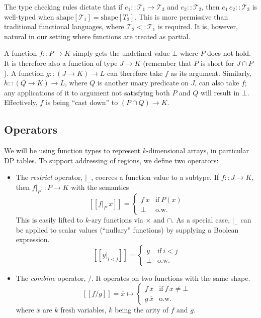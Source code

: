\documentclass{article}
\newcommand\newterm[1]{{\it #1}}
\newcommand\T{\mathcal{T}}
\newcommand\semp[1]{[\![{#1}]\!]}
\begin{document}
The type checking rules dictate that if $e_1::\T_1\to\T_3$ and $e_2::\T_2$, then $e_1\,e_2::\T_3$
is well-typed when $\mathrm{shape}[\T_1]=\mathrm{shape}[T_2]$. This is more permissive
than traditional functional languages, where $\T_2<:\T_1$ is required. It is, however,
natural in our setting where functions are treated as partial.

A function $f :: P\to K$ simply gets the undefined value $\bot$ where $P$ does not hold.
It is therefore also a function of type $J\to K$ (remember that $P$ is short for $J\cap P$).
A function $g :: (J\to K)\to L$ can therefore take $f$ as its argument.
Similarly, $h :: (Q\to K)\to L$, where $Q$ is another unary predicate on $J$, can also take $f$;
any applications of it to argument not satisfying both $P$ and $Q$ will result in $\bot$.
Effectively, $f$ is being ``cast down'' to $(P\cap Q)\to K$.

\subsection{Operators}

We will be using function types to represent $k$-dimensional arrays, in particular DP tables.
To support addressing of regions, we define two operators:

\begin{itemize}
  \item The \newterm{restrict} operator, $\big|_-$, coerces a function value to a subtype. 
    If $f::J\to K$, then $f\big|_P :: P\to K$
    with the semantics
    \[\semp{f\big|_P\ x} = \begin{cases}f\ x & \textrm{if}~P(x)\\ \bot & \textrm{o.w.}\end{cases}\]
    This is easily lifted to $k$-ary functions via $\times$ and $\cap$.
    As a special case, $\big|_-$ can be applied to scalar values (``nullary'' functions)
    by supplying a Boolean expression.
    \[\semp{y\big|_{i<j}} = \begin{cases}y & \textrm{if}~i<j \\ \bot & \textrm{o.w.}\end{cases}\]
  \item The \newterm{combine} operator, $/$. It operates on two functions with the same shape.
    \[\semp{f / g} = \overline{x}\mapsto\begin{cases}f\,\overline{x} & \textrm{if}~f\,\overline{x}\neq\bot \\ 
                                                     g\,\overline{x} & \textrm{o.w.}\end{cases}\]
    where $\overline{x}$ are $k$ fresh variables, $k$ being the arity of $f$ and $g$.
\end{itemize}
\end{document}

